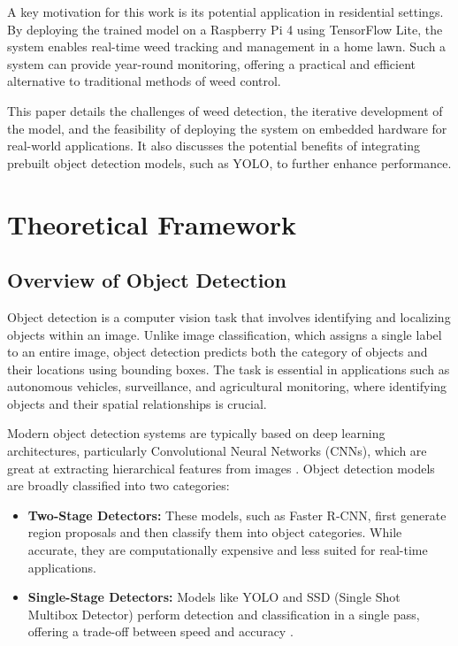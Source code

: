 \documentclass[conference]{IEEEtran}
\begin{document}
A key motivation for this work is its potential application in residential settings. By deploying the trained model on a Raspberry Pi 4 using TensorFlow Lite, the system enables real-time weed tracking and management in a home lawn. Such a system can provide year-round monitoring, offering a practical and efficient alternative to traditional methods of weed control.

This paper details the challenges of weed detection, the iterative development of the model, and the feasibility of deploying the system on embedded hardware for real-world applications. It also discusses the potential benefits of integrating prebuilt object detection models, such as YOLO, to further enhance performance.



\section{Theoretical Framework}
\subsection{Overview of Object Detection}
Object detection is a computer vision task that involves identifying and localizing objects within an image. Unlike image classification, which assigns a single label to an entire image, object detection predicts both the category of objects and their locations using bounding boxes. The task is essential in applications such as autonomous vehicles, surveillance, and agricultural monitoring, where identifying objects and their spatial relationships is crucial.

Modern object detection systems are typically based on deep learning architectures, particularly Convolutional Neural Networks (CNNs), which are great at extracting hierarchical features from images \cite{subeesh2022deep}. Object detection models are broadly classified into two categories:
\begin{itemize}
    \item \textbf{Two-Stage Detectors:} These models, such as Faster R-CNN, first generate region proposals and then classify them into object categories. While accurate, they are computationally expensive and less suited for real-time applications.
    \item \textbf{Single-Stage Detectors:} Models like YOLO and SSD (Single Shot Multibox Detector) perform detection and classification in a single pass, offering a trade-off between speed and accuracy \cite{rai2024weedvision}.
\end{itemize}
\end{document}
